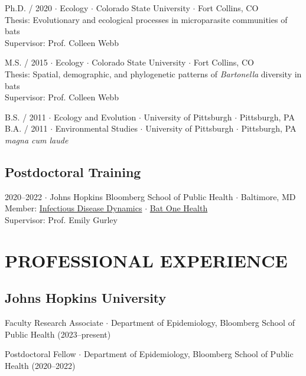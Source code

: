 \documentclass{cv}
\begin{document}
Ph.D. / 2020 $\cdot$ Ecology $\cdot$ Colorado State University $\cdot$ Fort Collins, CO \\
Thesis: Evolutionary and ecological processes in microparasite communities of bats \\
Supervisor: Prof. Colleen Webb

M.S. / 2015 $\cdot$ Ecology $\cdot$ Colorado State University $\cdot$ Fort Collins, CO \\
Thesis: Spatial, demographic, and phylogenetic patterns of \textit{Bartonella} diversity in bats \\
Supervisor: Prof. Colleen Webb

B.S. / 2011 $\cdot$ Ecology and Evolution $\cdot$ University of Pittsburgh $\cdot$ Pittsburgh, PA \\
B.A. / 2011 $\cdot$ Environmental Studies $\cdot$ University of Pittsburgh $\cdot$ Pittsburgh, PA \\
\textit{magna cum laude}

\subsection*{Postdoctoral Training}

2020--2022 $\cdot$ Johns Hopkins Bloomberg School of Public Health $\cdot$ Baltimore, MD \\
Member: \href{http://www.iddynamics.jhsph.edu/}{Infectious Disease Dynamics} $\cdot$ \href{https://batonehealth.org/}{Bat One Health} \\
Supervisor: Prof. Emily Gurley


\section*{PROFESSIONAL EXPERIENCE}

\subsection*{Johns Hopkins University}

Faculty Research Associate $\cdot$ Department of Epidemiology, Bloomberg School of Public Health (2023--present)

Postdoctoral Fellow $\cdot$ Department of Epidemiology, Bloomberg School of Public Health (2020--2022)
\end{document}
